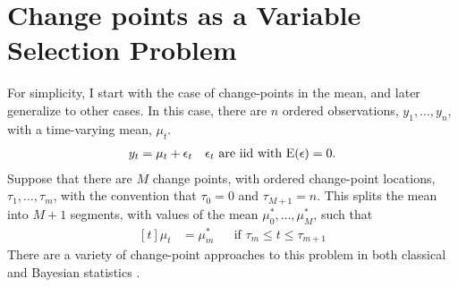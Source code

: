 \section{Change points as a Variable Selection Problem}
\label{dlm:sec:chang-as-vari}

For simplicity, I start with the case of change-points in the mean, and later generalize to other cases.
In this case, there are $n$ ordered observations, $y_{1}, \dots, y_{n}$, with a time-varying mean, $\mu_{t}$.
\begin{equation}
  \label{dlm:eq:17}
  \begin{aligned}[t]
    y_{t} & = \mu_{t} + \epsilon_{t} && \text{$\epsilon_{t}$ are iid with $\operatorname{E}(\epsilon) = 0$.} \\  
  \end{aligned}
\end{equation}
Suppose that there are $M$ change points, with ordered change-point locations, $\tau_{1}, \dots, \tau_{m}$, with the convention that $\tau_{0} = 0$ and $\tau_{M + 1} = n$.
This splits the mean into $M + 1$ segments, with values of the mean $\mu^{*}_{0}, \dots, \mu^{*}_{M}$,  such that
\begin{equation}
  \label{dlm:eq:1}
  \begin{aligned}[t]
    \mu_{t} &= \mu^{*}_{m} && \text{if $\tau_{m} \leq t \leq \tau_{m + 1}$}
  \end{aligned}
\end{equation}
There are a variety of change-point approaches to this problem in both classical \parencites{Page1954a}{Hinkley1970a}{BaiPerron2003a}{OlshenVenkatramanLucitoEtAl2004}{BaiPerron1998}{KillickFearnheadEckley2012} and Bayesian statistics \parencites{Yao1984}{BarryHartigan1993}{Chib1998}{Fearnhead2006a}{FearnheadLiu2007a}.


